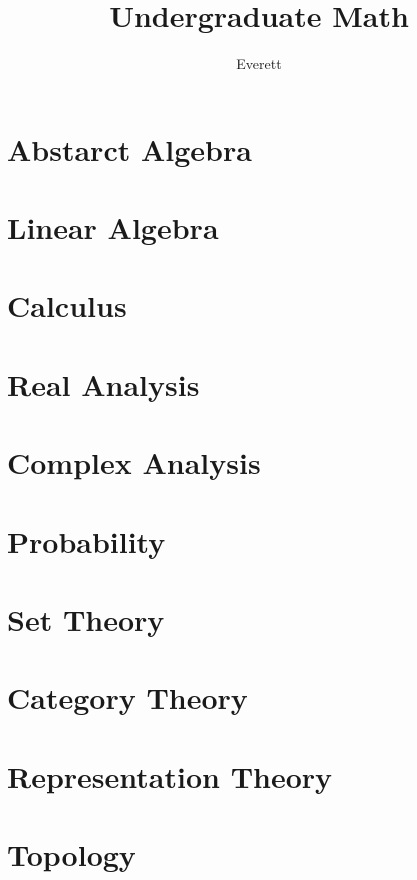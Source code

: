 \documentclass[11pt, a4paper]{scrbook}
\title{Undergraduate Math}
\author{Everett}
\begin{document}
\frontmatter
\maketitle
\newpage
\tableofcontents
\mainmatter
\part{Abstarct Algebra}
\parttoc


\part{Linear Algebra}
\parttoc
\part{Calculus}
\parttoc
\part{Real Analysis}
\parttoc
\part{Complex Analysis}
\parttoc
\part{Probability}
\parttoc
\part{Set Theory}
\parttoc
\part{Category Theory}
\parttoc
\part{Representation Theory}
\parttoc
\part{Topology}
\parttoc
\backmatter
\end{document}
